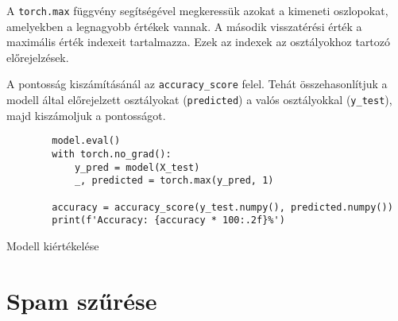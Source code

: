 \newpage
\begin{flushleft}
    A \verb|torch.max| függvény segítségével megkeressük azokat a kimeneti oszlopokat, amelyekben a legnagyobb értékek vannak. A második visszatérési érték a maximális érték indexeit tartalmazza. Ezek az indexek az osztályokhoz tartozó előrejelzések.
\end{flushleft}
\begin{flushleft}
    A pontosság kiszámításánál az \verb|accuracy_score| felel. Tehát összehasonlítjuk a modell által előrejelzett osztályokat (\verb|predicted|) a valós osztályokkal (\verb|y_test|), majd kiszámoljuk a pontosságot.
\end{flushleft}
\begin{listing}[H]
    \begin{verbatim}
        model.eval()
        with torch.no_grad():
            y_pred = model(X_test)
            _, predicted = torch.max(y_pred, 1)

        accuracy = accuracy_score(y_test.numpy(), predicted.numpy())
        print(f'Accuracy: {accuracy * 100:.2f}%')
    \end{verbatim}
    \caption{Modell kiértékelése}
    \label{code:eval}
\end{listing}

\section{Spam szűrése}
